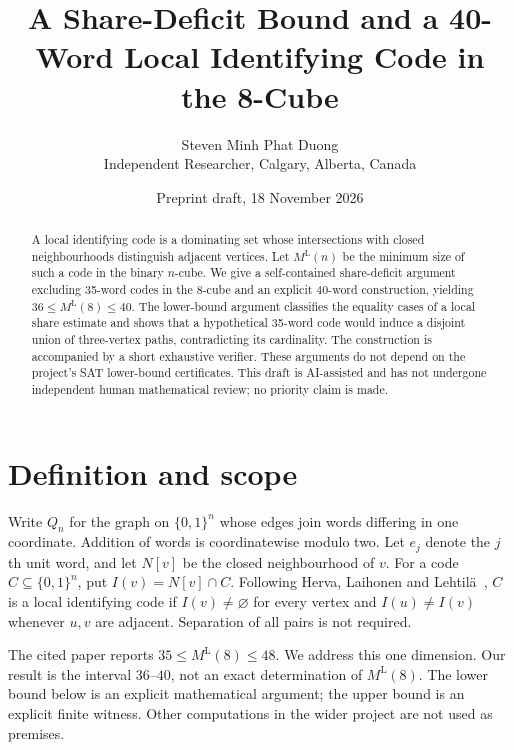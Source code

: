 \documentclass[11pt]{article}
\title{A Share-Deficit Bound and a 40-Word Local Identifying Code in the 8-Cube}
\author{Steven Minh Phat Duong\\\small Independent Researcher, Calgary, Alberta, Canada}
\date{Preprint draft, 18 November 2026}
\newcommand{\ML}{M^{\mathrm L}}
\begin{document}
\maketitle
\begin{abstract}
A local identifying code is a dominating set whose intersections with closed neighbourhoods distinguish adjacent vertices. Let $\ML(n)$ be the minimum size of such a code in the binary $n$-cube. We give a self-contained share-deficit argument excluding 35-word codes in the 8-cube and an explicit 40-word construction, yielding $36\le\ML(8)\le40$. The lower-bound argument classifies the equality cases of a local share estimate and shows that a hypothetical 35-word code would induce a disjoint union of three-vertex paths, contradicting its cardinality. The construction is accompanied by a short exhaustive verifier. These arguments do not depend on the project's SAT lower-bound certificates. This draft is AI-assisted and has not undergone independent human mathematical review; no priority claim is made.
\end{abstract}

\section{Definition and scope}
Write $Q_n$ for the graph on $\{0,1\}^n$ whose edges join words differing in one coordinate. Addition of words is coordinatewise modulo two. Let $e_j$ denote the $j$th unit word, and let $N[v]$ be the closed neighbourhood of $v$. For a code $C\subseteq\{0,1\}^n$, put $I(v)=N[v]\cap C$. Following Herva, Laihonen and Lehtil\"a~\cite{HLL}, $C$ is a local identifying code if $I(v)\ne\varnothing$ for every vertex and $I(u)\ne I(v)$ whenever $u,v$ are adjacent. Separation of all pairs is not required.

The cited paper reports $35\le\ML(8)\le48$. We address this one dimension. Our result is the interval $36$--$40$, not an exact determination of $\ML(8)$. The lower bound below is an explicit mathematical argument; the upper bound is an explicit finite witness. Other computations in the wider project are not used as premises.
\end{document}
